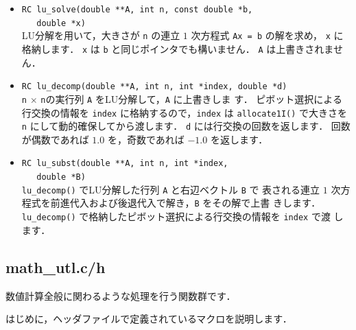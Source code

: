 \begin{itemize}
\item \verb|RC lu_solve(double **A, int n, const double *b, | \\
	\verb|   double *x)| \ \\
LU分解を用いて，大きさが \verb|n| の連立 $1$ 次方程式 \verb|Ax = b| の解を求め，
\verb|x| に格納します．
\verb|x| は \verb|b| と同じポインタでも構いません．
\verb|A| は上書きされません．

\item \verb|RC lu_decomp(double **A, int n, int *index, double *d)| \ \\
\verb|n| $\times$ \verb|n|の実行列 \verb|A| をLU分解して，\verb|A| に上書きしま
す．
ピボット選択による行交換の情報を \verb|index| に格納するので，\verb|index| は
\verb|allocate1I()| で大きさを \verb|n| にして動的確保してから渡します．
\verb|d| には行交換の回数を返します．
回数が偶数であれば $1.0$ を，奇数であれば $-1.0$ を返します．

\item \verb|RC lu_subst(double **A, int n, int *index, | \\
	\verb|   double *B)| \ \\
\verb|lu_decomp()| でLU分解した行列 \verb|A| と右辺ベクトル \verb|B| で
表される連立 $1$ 次方程式を前進代入および後退代入で解き，\verb|B| をその解で上書
きします．
\verb|lu_decomp()| で格納したピボット選択による行交換の情報を \verb|index| で渡
します．
\end{itemize}


\subsection{math\_utl.c/h}

数値計算全般に関わるような処理を行う関数群です．

はじめに，ヘッダファイルで定義されているマクロを説明します．

